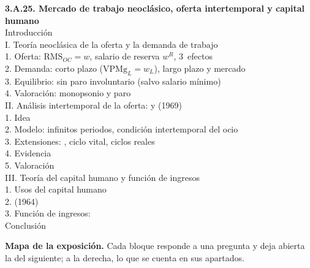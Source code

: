 \documentclass[11pt]{article}
\begin{document}
\begin{esquema}
\textbf{3.A.25. Mercado de trabajo neoclásico, oferta intertemporal y capital humano}\\[2pt]
Introducción\\
I. Teoría neoclásica de la oferta y la demanda de trabajo\\
\hspace*{1.5em}1. Oferta: $\mathrm{RMS}_{OC}=w$, salario de reserva $w^R$, 3~efectos\\
\hspace*{1.5em}2. Demanda: corto plazo ($\mathrm{VPMg}_L=w_L$), largo plazo y mercado\\
\hspace*{1.5em}3. Equilibrio: sin paro involuntario (salvo salario mínimo)\\
\hspace*{1.5em}4. Valoración: monopsonio y paro\\
II. Análisis intertemporal de la oferta:  y  (1969)\\
\hspace*{1.5em}1. Idea\\
\hspace*{1.5em}2. Modelo: infinitos periodos, condición intertemporal del ocio\\
\hspace*{1.5em}3. Extensiones: , ciclo vital, ciclos reales\\
\hspace*{1.5em}4. Evidencia\\
\hspace*{1.5em}5. Valoración\\
III. Teoría del capital humano y función de ingresos\\
\hspace*{1.5em}1. Usos del capital humano\\
\hspace*{1.5em}2.  (1964)\\
\hspace*{1.5em}3. Función de ingresos: \\
Conclusión
\end{esquema}

\begin{anotaciones}
\textbf{Mapa de la exposición.} Cada bloque responde a una pregunta y deja abierta la del siguiente; a la derecha, lo que se cuenta en sus apartados.
\begin{infografiacaja}
\caption{Mapa de la exposición: la pregunta de cada bloque y el hilo que los une}\label{figu:mapa-tema}
\end{infografiacaja}
\end{anotaciones}
\end{document}
